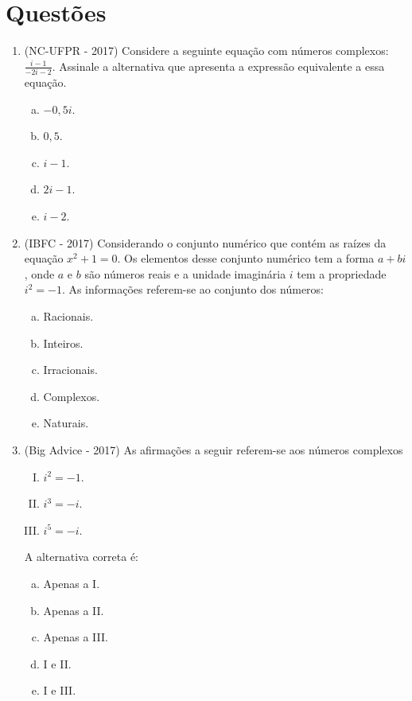 \section{Questões}

 \begin{enumerate}
  \item (NC-UFPR - 2017) Considere a seguinte equação com números complexos: $\frac{i - 1}{-2i - 2}$. Assinale a alternativa que apresenta a expressão equivalente a essa equação.
  \begin{enumerate}[a)]
  \item $-0,5 i$.
  \item $0,5$.
  \item $i - 1$.
  \item $2i - 1$.
  \item $i - 2$.
  \end{enumerate}

  \item (IBFC - 2017) Considerando o conjunto numérico que contém as raízes da equação $x^2+1=0$. Os elementos desse conjunto numérico tem a forma $a+bi$, onde $a$ e $b$ são números reais e a unidade imaginária $i$ tem a propriedade $i^2=-1$. As informações referem-se ao conjunto dos números:
  \begin{enumerate}[a)]
  \item Racionais.
  \item Inteiros.
  \item Irracionais.
  \item Complexos.
  \item Naturais.
  \end{enumerate}

  \item (Big Advice - 2017) As afirmações a seguir referem-se aos números complexos

   \begin{enumerate}[I)]
  \item $i^2= -1$.
  \item $i^3= -i$.
  \item $i^5= -i$.
  \end{enumerate}
 A alternativa correta é:
  \begin{enumerate}[a)]
  \item Apenas a I.
  \item Apenas a II.
  \item Apenas a III.
  \item I e II.
  \item I e III.
  \end{enumerate}


\end{enumerate}
